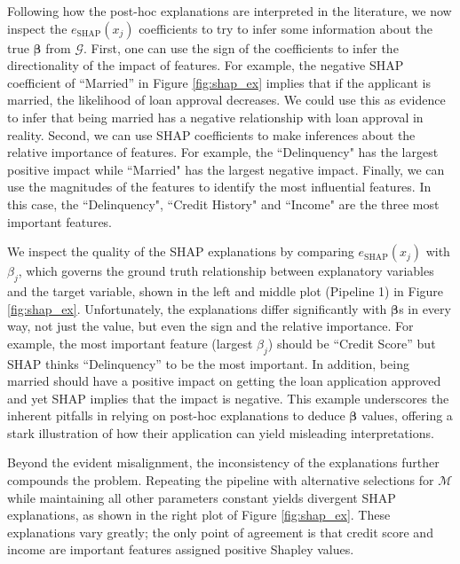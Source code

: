 \documentclass[mnsc,blindrev]{informs3}
\newcommand{\mG}{\mathcal{G}}
\begin{document}
 Following how the post-hoc explanations are interpreted in the literature,  we now inspect the $e_\text{SHAP}(x_j)$ coefficients to try to infer some information about the true $\boldsymbol{\beta}$ from $\mG$. First, one can use the sign of the coefficients to infer the directionality of the impact of features. For example, the negative SHAP coefficient of ``Married'' in Figure \ref{fig:shap_ex} implies that if the applicant is married, the likelihood of loan approval decreases. We could use this as evidence to infer that being married  has a negative relationship with loan approval in reality. Second, we can use SHAP coefficients to make inferences about the relative importance of features. For example, the ``Delinquency" has the largest positive impact while ``Married" has the largest negative impact. Finally, we can use the magnitudes of the features to identify the most influential features. In this case, the ``Delinquency", ``Credit History" and ``Income" are the three most important features. %


We inspect the quality of the SHAP explanations by comparing $e_\text{SHAP}(x_j)$ with $\beta_j$, which governs the ground truth relationship between explanatory variables and the target variable, shown in the left and middle plot (Pipeline 1) in Figure \ref{fig:shap_ex}. Unfortunately, the explanations differ significantly with $\boldsymbol{\beta}$s in every way, not just the value, but even the sign and the relative importance. For example, the most important feature (largest $\beta_j$) should be ``Credit Score'' but SHAP thinks ``Delinquency'' to be the most important. In addition, being married should have a positive impact on getting the loan application approved and yet SHAP implies that the impact is negative.  This example underscores the inherent pitfalls in relying on post-hoc explanations to deduce $\boldsymbol{\beta}$ values, offering a stark illustration of how their application can yield misleading interpretations. 

Beyond the evident misalignment, the inconsistency of the explanations further compounds the problem. Repeating the pipeline with alternative selections for $\mathcal{M}$ while maintaining all other parameters constant yields divergent SHAP explanations, as shown in the right plot of Figure \ref{fig:shap_ex}. These explanations vary greatly; the only point of agreement is that credit score and income are important features assigned positive Shapley values. 
\end{document}
